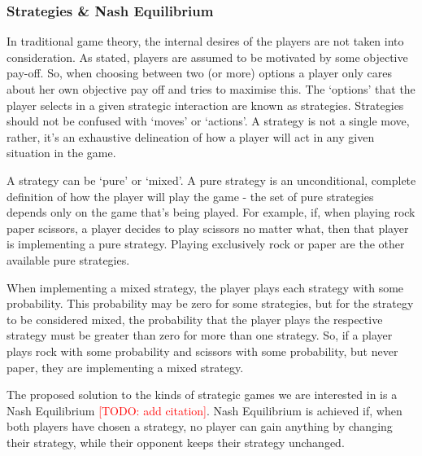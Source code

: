 \documentclass[11pt]{article}
\newcommand{\todo}[1]{\textcolor{red}{[TODO: #1]}\PackageWarning{TODO:}{#1!}}
\newcommand*{\np}{\par\noindent\newline}
\begin{document}
\subsubsection{Strategies \& Nash Equilibrium}
In traditional game theory, the internal desires of the players are  not
taken into consideration. As stated, players are assumed to be motivated by
some objective pay-off. So, when choosing between two (or more) options a
player only cares about her own objective pay off and tries to maximise this.
The `options' that the player selects in a given strategic interaction are
known as strategies. Strategies should not be confused with `moves' or
`actions'. A strategy is not a single move, rather, it's an exhaustive
delineation of how a player will act in any given situation in the game.
\np A strategy can be `pure' or `mixed'. A pure strategy is an unconditional,
complete definition of how the player will play the game - the set of pure
strategies depends only on the game that's being played. For example, if, when
playing rock paper scissors, a player decides to play scissors no matter what,
then that player is implementing a pure strategy. Playing exclusively rock or
paper are the other available pure strategies.
\np When implementing a mixed strategy, the player plays each strategy with
some probability. This probability may be zero for some strategies, but for the
strategy to be considered mixed, the probability that the player plays the
respective strategy must be greater than zero for more than one strategy. So,
if a player plays rock with some probability and scissors with some
probability, but never paper, they are implementing a mixed strategy.
\np The proposed solution to the kinds of strategic games we are interested in
is a Nash Equilibrium \todo{add citation}. Nash Equilibrium is achieved if,
when both players have chosen a strategy, no player can gain anything by
changing their strategy, while their opponent keeps their strategy unchanged. 
\end{document}
